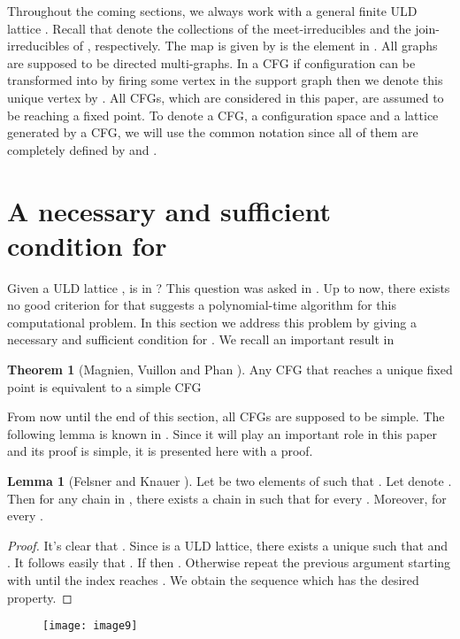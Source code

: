\documentclass{article}
\theoremstyle{definition}
\newtheorem{lem}{Lemma}
\newtheorem{theo}{Theorem}
\begin{document}
Throughout the coming sections, we always work with a general finite ULD lattice . Recall that  denote the collections of the meet-irreducibles and the join-irreducibles of , respectively. The map  is given by  is the element in . All graphs are supposed to be directed multi-graphs. In a CFG if configuration  can be transformed into  by firing some vertex in the support graph then we denote this unique vertex by . All CFGs, which are considered in this paper, are assumed to be reaching a fixed point. To denote a CFG, a configuration space and a lattice generated by a CFG, we will use the common notation  since all of them are completely defined by  and .
\section{A necessary and sufficient condition for }
\label{third section}
Given a ULD lattice , is  in ? This question was asked in \cite{MVP01}. Up to now, there exists no good criterion for   that suggests a polynomial-time algorithm for this computational problem. In this section we address this problem by giving a necessary and sufficient condition for . We recall an important result in \cite{MVP01}
\begin{theo}[Magnien, Vuillon and Phan \cite{MVP01}]
\label{theorem of simple CFG}
Any CFG that reaches a unique fixed point is equivalent to a simple CFG
\end{theo}
From now until the end of this section, all CFGs are supposed to be simple. The following lemma is known in \cite{FK09}. Since it will play an important role in this paper and its proof is simple, it is presented here with a proof.
\begin{lem}[Felsner and Knauer \cite{FK09}]
\label{lemma of the square connection}
Let  be two elements of  such that . Let  denote . Then for any chain  in , there exists a chain  in  such that  for every . Moreover,   for every . 
\end{lem}
\begin{proof}
It's clear that . Since  is a ULD lattice, there exists a unique  such that  and . It follows easily that . If  then . Otherwise  repeat the previous argument starting with  until the index reaches . We obtain the sequence  which has the desired property.
\end{proof}
\begin{figure}[!h]
\centering
\texttt{[image: image9]}
\end{figure}
\end{document}
